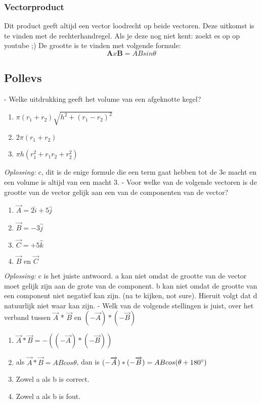 \documentclass[12pt,a4paper]{article}
\begin{document}
	\subsubsection{Vectorproduct}
	Dit product geeft altijd een vector loodrecht op beide vectoren. Deze uitkomst is te vinden met de rechterhandregel. Als je deze nog niet kent: zoekt es op op youtube ;) 
	De grootte is te vinden met volgende formule: 
	\[\textbf{A} x \textbf{B} = ABsin\theta\]
	
	\subsection{Pollevs}
	- Welke uitdrukking geeft het volume van een afgeknotte kegel?
	\begin{enumerate} [label=\alph*)]
		\item \(\pi(r_1 + r_2)\sqrt{h^2 + (r_1 - r_2)^2}\)
		\item \(2\pi(r_1 + r_2)\)
		\item \(\pi h(r_1^2 + r_1r_2 + r_2^2)\)
	\end{enumerate}
	\textit{Oplossing:} c, dit is de enige formule die een term gaat hebben tot de 3e macht en een volume is altijd van een macht 3. 
	\newline
	- Voor welke van de volgende vectoren is de grootte van de vector gelijk aan een van de componenten van de vector? 
	\begin{enumerate}[label = \alph*)]
		\item \(\overrightarrow{A} = 2\hat{i} + 5\hat{j}\)
		\item \(\overrightarrow{B} = -3\hat{j}\)
		\item \(\overrightarrow{C} = +5\hat{k}\)
		\item \(\overrightarrow{B} \text{ en } \overrightarrow{C}\)
	\end{enumerate}
	\textit{Oplossing:} c is het juiste antwoord. a kan niet omdat de grootte van de vector moet gelijk zijn aan de grote van de component. b kan niet omdat de grootte van een component niet negatief kan zijn. (na te kijken, not sure). Hieruit volgt dat d natuurlijk niet waar kan zijn. 
	\newline
	- Welk van de volgende stellingen is juist, over het verband tussen $\overrightarrow{A}$ * $\overrightarrow{B}$ en \((-\overrightarrow{A}) * (-\overrightarrow{B})\)
	\begin{enumerate}[label=\alph*)]
		\item \(\overrightarrow{A} * \overrightarrow{B} = -((-\overrightarrow{A})*(-\overrightarrow{B}))\)
		\item als \(\overrightarrow{A} * \overrightarrow{B} = ABcos\theta \), dan is \((-\overrightarrow{A}) * (-\overrightarrow{B}) = ABcos(\theta + 180\degree)\)
		\item Zowel a als b is correct. 
		\item Zowel a als b is fout. 
	\end{enumerate}
\end{document}
